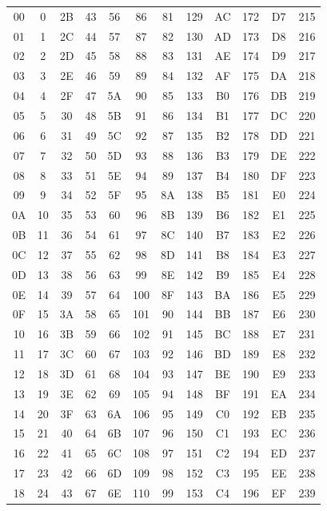 \documentclass[11pt,a4paper]{book}
\begin{document}
\begin{longtable}{|c|c||c|c||c|c||c|c||c|c||c|c|}
00 & 0 & 2B & 43 & 56 & 86 & 81 & 129 & AC & 172 & D7 & 215 \\
01 & 1 & 2C & 44 & 57 & 87 & 82 & 130 & AD & 173 & D8 & 216 \\
02 & 2 & 2D & 45 & 58 & 88 & 83 & 131 & AE & 174 & D9 & 217 \\
03 & 3 & 2E & 46 & 59 & 89 & 84 & 132 & AF & 175 & DA & 218 \\
04 & 4 & 2F & 47 & 5A & 90 & 85 & 133 & B0 & 176 & DB & 219 \\
05 & 5 & 30 & 48 & 5B & 91 & 86 & 134 & B1 & 177 & DC & 220 \\
06 & 6 & 31 & 49 & 5C & 92 & 87 & 135 & B2 & 178 & DD & 221 \\
07 & 7 & 32 & 50 & 5D & 93 & 88 & 136 & B3 & 179 & DE & 222 \\
08 & 8 & 33 & 51 & 5E & 94 & 89 & 137 & B4 & 180 & DF & 223 \\
09 & 9 & 34 & 52 & 5F & 95 & 8A & 138 & B5 & 181 & E0 & 224 \\
0A & 10 & 35 & 53 & 60 & 96 & 8B & 139 & B6 & 182 & E1 & 225 \\
0B & 11 & 36 & 54 & 61 & 97 & 8C & 140 & B7 & 183 & E2 & 226 \\
0C & 12 & 37 & 55 & 62 & 98 & 8D & 141 & B8 & 184 & E3 & 227 \\
0D & 13 & 38 & 56 & 63 & 99 & 8E & 142 & B9 & 185 & E4 & 228 \\
0E & 14 & 39 & 57 & 64 & 100 & 8F & 143 & BA & 186 & E5 & 229 \\
0F & 15 & 3A & 58 & 65 & 101 & 90 & 144 & BB & 187 & E6 & 230 \\
10 & 16 & 3B & 59 & 66 & 102 & 91 & 145 & BC & 188 & E7 & 231 \\
11 & 17 & 3C & 60 & 67 & 103 & 92 & 146 & BD & 189 & E8 & 232 \\
12 & 18 & 3D & 61 & 68 & 104 & 93 & 147 & BE & 190 & E9 & 233 \\
13 & 19 & 3E & 62 & 69 & 105 & 94 & 148 & BF & 191 & EA & 234 \\
14 & 20 & 3F & 63 & 6A & 106 & 95 & 149 & C0 & 192 & EB & 235 \\
15 & 21 & 40 & 64 & 6B & 107 & 96 & 150 & C1 & 193 & EC & 236 \\
16 & 22 & 41 & 65 & 6C & 108 & 97 & 151 & C2 & 194 & ED & 237 \\
17 & 23 & 42 & 66 & 6D & 109 & 98 & 152 & C3 & 195 & EE & 238 \\
18 & 24 & 43 & 67 & 6E & 110 & 99 & 153 & C4 & 196 & EF & 239 \\

\end{longtable}
\end{document}
